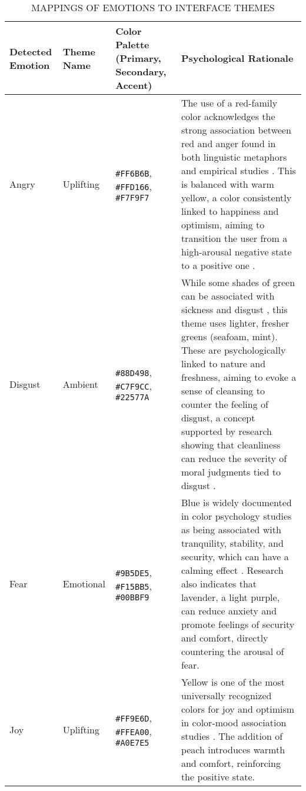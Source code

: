 \documentclass[conference]{IEEEtran}
\begin{document}
	
	
	\begin{table*}[t]
		\caption{MAPPINGS OF EMOTIONS TO INTERFACE THEMES}
		\label{tab:theme_mappings}
		\centering
		\begin{tabular}{|p{}|p{}|p{}|p{}|}
			\hline
			\textbf{Detected Emotion} & \textbf{Theme Name} & \textbf{Color Palette (Primary, Secondary, Accent)} & \textbf{Psychological Rationale} \\
			\hline
			Angry & Uplifting & \cellcolor{angryPrimary}\texttt{\#FF6B6B}, \cellcolor{angrySecondary}\texttt{\#FFD166}, \cellcolor{angryAccent}\texttt{\#F7F9F7} &  The use of a red-family color acknowledges the strong association between red and anger found in both linguistic metaphors and empirical studies \cite{b1}. This is balanced with warm yellow, a color consistently linked to happiness and optimism, aiming to transition the user from a high-arousal negative state to a positive one \cite{b2}. \\
			\hline
			Disgust & Ambient & \cellcolor{disgustPrimary}\texttt{\#88D498}, \cellcolor{disgustSecondary}\texttt{\#C7F9CC}, \cellcolor{disgustAccent}\texttt{\#22577A} & While some shades of green can be associated with sickness and disgust \cite{b3}, this theme uses lighter, fresher greens (seafoam, mint). These are psychologically linked to nature and freshness, aiming to evoke a sense of cleansing to counter the feeling of disgust, a concept supported by research showing that cleanliness can reduce the severity of moral judgments tied to disgust \cite{b4}. \\
			\hline
			Fear & Emotional & \cellcolor{fearPrimary}\texttt{\#9B5DE5}, \cellcolor{fearSecondary}\texttt{\#F15BB5}, \cellcolor{fearAccent}\texttt{\#00BBF9} &  Blue is widely documented in color psychology studies as being associated with tranquility, stability, and security, which can have a calming effect \cite{b5}. Research also indicates that lavender, a light purple, can reduce anxiety and promote feelings of security and comfort, directly countering the arousal of fear. \\
			\hline
			Joy & Uplifting & \cellcolor{joyPrimary}\texttt{\#FF9E6D}, \cellcolor{joySecondary}\texttt{\#FFEA00}, \cellcolor{joyAccent}\texttt{\#A0E7E5} & Yellow is one of the most universally recognized colors for joy and optimism in color-mood association studies \cite{b2, b6}. The addition of peach introduces warmth and comfort, reinforcing the positive state. \\

\end{tabular}
\end{table*}
\end{document}
